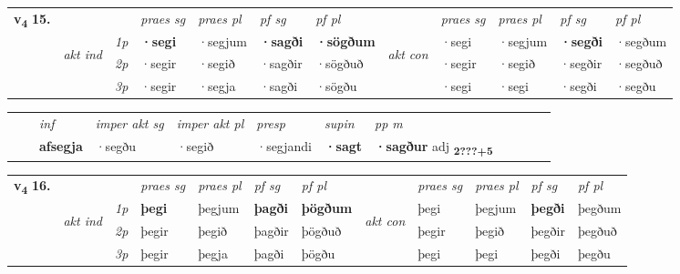\begin{tabular}{llllllllllll} \toprule
\multirow{4}{*}{{{\textbf{v{\textsubscript{4}}} \Large{\textbf{15.}}}}}  & &   &  \textit{praes sg}  & \textit{praes pl}  &\textit{ pf sg} & \textit{pf pl} &  &  \textit{praes sg}  & \textit{praes pl}  & \textit{pf sg} & \textit{pf pl } \\*
	\cmidrule{4-7} \cmidrule{9-12}
 & \multirow{3}{*}{\begin{turn}{90}\textit{akt ind}\end{turn}} & {\textit{1p}} & \textbf{·segi} & ·segjum    & \textbf{·sagði} & \textbf{·sögðum} & \multirow{3}{*}{\begin{turn}{90}\textit{akt con}\end{turn}} &·segi & ·segjum & \textbf{·segði} & ·segðum\\*
& &  {\textit{2p}} &  ·segir  & ·segið   & ·sagðir & ·sögðuð & & ·segir & ·segið & ·segðir & ·segðuð \\*
& &  {\textit{3p}} & ·segir & ·segja   & ·sagði & ·sögðu & & ·segi & ·segi& ·segði & ·segðu  \\*
\cmidrule{4-7} \cmidrule{9-12}
\end{tabular}


\begin{tabular}{llllllllllll}
 & & \textit{inf} & \textit{imper akt sg} & \textit{imper akt pl}   & \textit{presp} & \textit{supin}  & \textit{pp m}     \\*
  & & \textbf{afsegja} & ·segðu  & ·segið   & ·segjandi &  \textbf{·sagt}  & \textbf{·sagður} adj \textbf{\textsubscript{2???+5}} \\*
\cmidrule{1-12}
\end{tabular}



\begin{tabular}{llllllllllll} \toprule
\multirow{4}{*}{{{\textbf{v{\textsubscript{4}}} \Large{\textbf{16.}}}}}  & &   &  \textit{praes sg}  & \textit{praes pl}  &\textit{ pf sg} & \textit{pf pl} &  &  \textit{praes sg}  & \textit{praes pl}  & \textit{pf sg} & \textit{pf pl } \\*
	\cmidrule{4-7} \cmidrule{9-12}
 & \multirow{3}{*}{\begin{turn}{90}\textit{akt ind}\end{turn}} & {\textit{1p}} & \textbf{þegi} & þegjum    & \textbf{þagði} & \textbf{þögðum} & \multirow{3}{*}{\begin{turn}{90}\textit{akt con}\end{turn}} &þegi & þegjum & \textbf{þegði} & þegðum\\*
& &  {\textit{2p}} &  þegir  & þegið   & þagðir & þögðuð & & þegir & þegið & þegðir & þegðuð \\*
& &  {\textit{3p}} & þegir & þegja   & þagði & þögðu & & þegi & þegi& þegði & þegðu  \\*
\cmidrule{4-7} \cmidrule{9-12}
\end{tabular}



